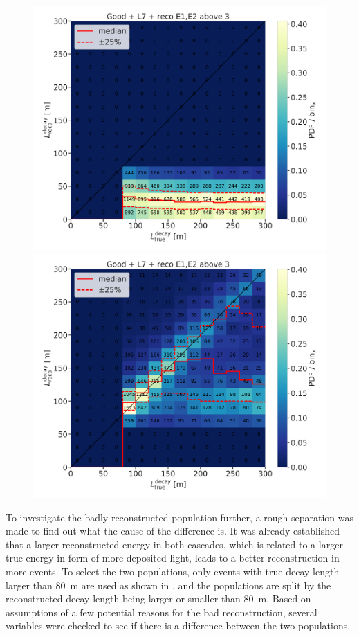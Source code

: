 \begin{figure}[h]
    \centering
    \includegraphics[width=0.49\linewidth]{figures/results/190607/second_population/190607_millipede_level_no_NaNs_NEW_flipped_reco_decayL_vs_true_decayL_reco_above3_population_in_step_contours.png}
    \includegraphics[width=0.49\linewidth]{figures/results/190607/second_population/190607_millipede_level_no_NaNs_NEW_flipped_reco_decayL_vs_true_decayL_reco_above3_population_out_step_contours.png}
    \caption[]{}
\end{figure}

To investigate the badly reconstructed population further, a rough separation was made to find out what the cause of the difference is. It was already established that a larger reconstructed energy in both cascades, which is related to a larger true energy in form of more deposited light, leads to a better reconstruction in more events. To select the two populations, only events with true decay length larger than \SI{80}{\meter} are used as shown in , and the populations are split by the reconstructed decay length being larger or smaller than \SI{80}{\meter}. Based on assumptions of a few potential reasons for the bad reconstruction, several variables were checked to see if there is a difference between the two populations.

